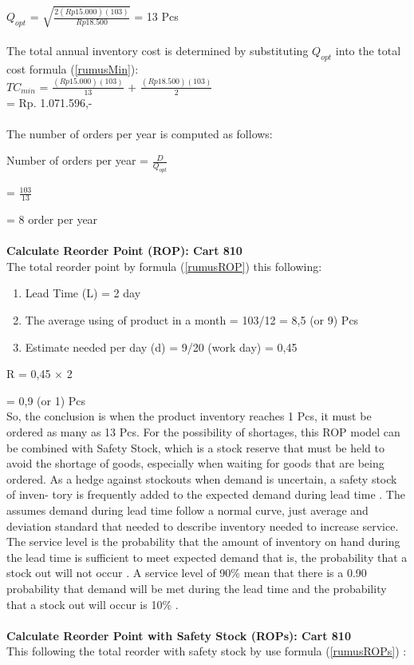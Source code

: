 \documentclass[12pt,a4paper,final]{iopart}
\begin{document}
$Q_{opt}$ = $\sqrt{\frac{2(Rp15.000)(103)}{Rp18.500}}$ = 13 Pcs\\ \\
The total annual inventory cost is determined by substituting $Q_{opt}$ into the total cost formula (\ref{rumusMin}):\\

$TC_{min}$ = $\frac{(Rp15.000)(103)}{13}$ + $\frac{(Rp18.500)(103)}{2}$\\

= Rp. 1.071.596,-\\ \\
The number of orders per year is computed as follows:

Number of orders per year = $\frac{D}{Q_{opt}}$

= $\frac{103}{13}$

= 8 order per year\\ \\
\textbf{Calculate Reorder Point (ROP): Cart 810}\\
The total reorder point by formula (\ref{rumusROP}) this following:
\begin{enumerate}[label=(\alph*)]
	\item Lead Time (L) = 2 day 
	\item The average using of product in a month = 103/12 = 8,5 (or 9) Pcs
	\item Estimate needed per day (d) = 9/20 (work day) = 0,45
\end{enumerate}

R = 0,45 $\times$ 2

= 0,9 (or 1) Pcs\\

So, the conclusion is when the product inventory reaches 1 Pcs, it must be ordered as many as 13 Pcs. For the possibility of shortages, this ROP model can be combined with Safety Stock, which is a stock reserve that must be held to avoid the shortage of goods, especially when waiting for goods that are being ordered. As a hedge against stockouts when demand is uncertain, a safety stock of inven- tory is frequently added to the expected demand during lead time \cite{Rusell2011}. The assumes demand during lead time follow a normal curve, just average and deviation standard that needed to describe inventory needed to increase service. The service level is the probability that the amount of inventory on hand during the lead time is sufficient to meet expected demand that is, the probability that a stock out will not occur \cite{Rusell2011}. A service level of 90\% mean that there is a 0.90 probability that demand will be met during the lead time and the probability that a stock out will occur is 10\% \cite{Rusell2011}.\\ \\
\textbf{Calculate Reorder Point with Safety Stock (ROPs): Cart 810}\\
This following the total reorder with safety stock by use formula (\ref{rumusROPs}) :
\end{document}
